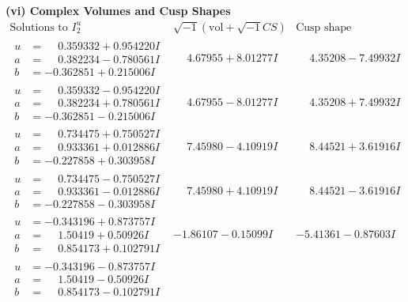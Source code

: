 \documentclass[1p]{elsarticle_modified}
\theoremstyle{definition}
\newcommand{\I}{\sqrt{-1}}
\begin{document}
\newpage\flushleft \textbf{(vi) Complex Volumes and Cusp Shapes}
$$\begin{array}{c|c|c}  
\text{Solutions to }I^u_{2}& \I (\text{vol} + \sqrt{-1}CS) & \text{Cusp shape}\\
 \hline 
\begin{aligned}
u &= \phantom{-}0.359332 + 0.954220 I \\
a &= \phantom{-}0.382234 - 0.780561 I \\
b &= -0.362851 + 0.215006 I\end{aligned}
 & \phantom{-}4.67955 + 8.01277 I & \phantom{-}4.35208 - 7.49932 I \\ \hline\begin{aligned}
u &= \phantom{-}0.359332 - 0.954220 I \\
a &= \phantom{-}0.382234 + 0.780561 I \\
b &= -0.362851 - 0.215006 I\end{aligned}
 & \phantom{-}4.67955 - 8.01277 I & \phantom{-}4.35208 + 7.49932 I \\ \hline\begin{aligned}
u &= \phantom{-}0.734475 + 0.750527 I \\
a &= \phantom{-}0.933361 + 0.012886 I \\
b &= -0.227858 + 0.303958 I\end{aligned}
 & \phantom{-}7.45980 - 4.10919 I & \phantom{-}8.44521 + 3.61916 I \\ \hline\begin{aligned}
u &= \phantom{-}0.734475 - 0.750527 I \\
a &= \phantom{-}0.933361 - 0.012886 I \\
b &= -0.227858 - 0.303958 I\end{aligned}
 & \phantom{-}7.45980 + 4.10919 I & \phantom{-}8.44521 - 3.61916 I \\ \hline\begin{aligned}
u &= -0.343196 + 0.873757 I \\
a &= \phantom{-}1.50419 + 0.50926 I \\
b &= \phantom{-}0.854173 + 0.102791 I\end{aligned}
 & -1.86107 - 0.15099 I & -5.41361 - 0.87603 I \\ \hline\begin{aligned}
u &= -0.343196 - 0.873757 I \\
a &= \phantom{-}1.50419 - 0.50926 I \\
b &= \phantom{-}0.854173 - 0.102791 I\end{aligned}

\end{array}$$
\end{document}
